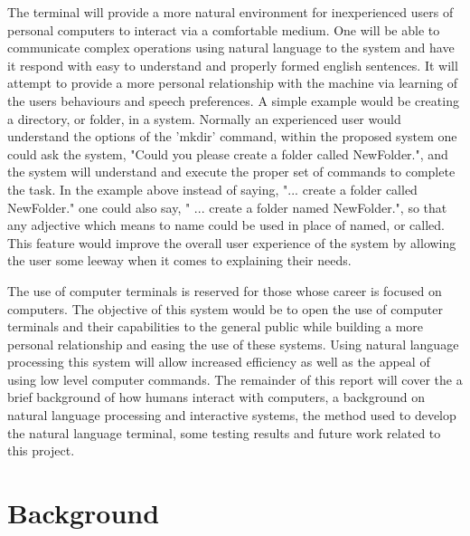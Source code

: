 \documentclass[12pt]{article}
\begin{document}
The terminal will provide a more natural environment for inexperienced users of personal computers to interact via a comfortable medium. One will be able to communicate complex operations using natural language to the system and have it respond with easy to understand and properly formed english sentences. It will attempt to provide a more personal relationship with the machine via learning of the users behaviours and speech preferences.\cite{ogden} A simple example would be creating a directory, or folder, in a system. Normally an experienced user would understand the options of the 'mkdir' command, within the proposed system one could ask the system, "Could you please create a folder called NewFolder.", and the system will understand and execute the proper set of commands to complete the task. In the example above instead of saying, "... create a folder called NewFolder." one could also say, " ... create a folder named NewFolder.", so that any adjective which means to name could be used in place of named, or called. This feature would improve the overall user experience of the system by allowing the user some leeway when it comes to explaining their needs.\cite{kelly}

The use of computer terminals is reserved for those whose career is focused on computers. The objective of this system would be to open the use of computer terminals and their capabilities to the general public while building a more personal relationship and easing the use of these systems. Using natural language processing this system will allow increased efficiency as well as the appeal of using low level computer commands. The remainder of this report will cover the a brief background of how humans interact with computers, a background on natural language processing and interactive systems, the method used to develop the natural language terminal, some testing results and future work related to this project.

\section{Background}
\end{document}
